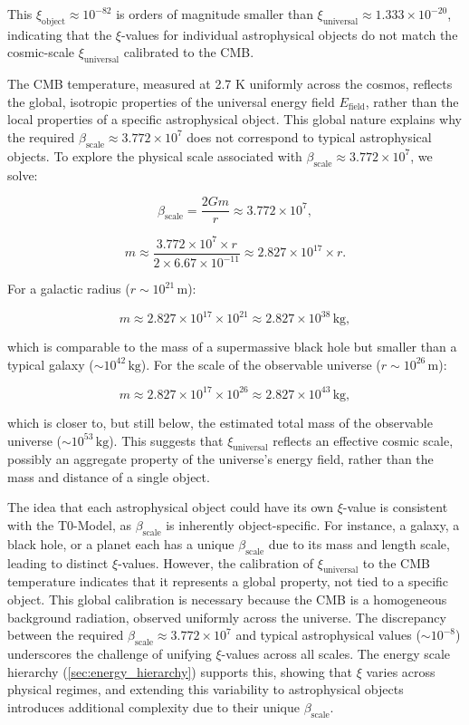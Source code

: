 \documentclass[12pt,a4paper]{report}
\newcommand{\Efield}{E_{\text{field}}}
\newcommand{\xipar}{\xi}
\newcommand{\xiuniversal}{\xi_{\text{universal}}}
\newcommand{\betascale}{\beta_{\text{scale}}}
\theoremstyle{definition}
\begin{document}
	
	This \(\xi_{\text{object}} \approx 10^{-82}\) is orders of magnitude smaller than \(\xiuniversal \approx 1.333 \times 10^{-20}\), indicating that the \(\xipar\)-values for individual astrophysical objects do not match the cosmic-scale \(\xiuniversal\) calibrated to the CMB.
	
	The CMB temperature, measured at 2.7 K uniformly across the cosmos, reflects the global, isotropic properties of the universal energy field \(\Efield\), rather than the local properties of a specific astrophysical object. This global nature explains why the required \(\betascale \approx 3.772 \times 10^7\) does not correspond to typical astrophysical objects. To explore the physical scale associated with \(\betascale \approx 3.772 \times 10^7\), we solve:
	
	\[
	\betascale = \frac{2Gm}{r} \approx 3.772 \times 10^7,
	\]
	
	\[
	m \approx \frac{3.772 \times 10^7 \times r}{2 \times 6.67 \times 10^{-11}} \approx 2.827 \times 10^{17} \times r.
	\]
	
	For a galactic radius (\(r \sim 10^{21} \, \text{m}\)):
	
	\[
	m \approx 2.827 \times 10^{17} \times 10^{21} \approx 2.827 \times 10^{38} \, \text{kg},
	\]
	
	which is comparable to the mass of a supermassive black hole but smaller than a typical galaxy (\(\sim 10^{42} \, \text{kg}\)). For the scale of the observable universe (\(r \sim 10^{26} \, \text{m}\)):
	
	\[
	m \approx 2.827 \times 10^{17} \times 10^{26} \approx 2.827 \times 10^{43} \, \text{kg},
	\]
	
	which is closer to, but still below, the estimated total mass of the observable universe (\(\sim 10^{53} \, \text{kg}\)). This suggests that \(\xiuniversal\) reflects an effective cosmic scale, possibly an aggregate property of the universe's energy field, rather than the mass and distance of a single object.
	
	The idea that each astrophysical object could have its own \(\xipar\)-value is consistent with the T0-Model, as \(\betascale\) is inherently object-specific. For instance, a galaxy, a black hole, or a planet each has a unique \(\betascale\) due to its mass and length scale, leading to distinct \(\xipar\)-values. However, the calibration of \(\xiuniversal\) to the CMB temperature indicates that it represents a global property, not tied to a specific object. This global calibration is necessary because the CMB is a homogeneous background radiation, observed uniformly across the universe. The discrepancy between the required \(\betascale \approx 3.772 \times 10^7\) and typical astrophysical values (\(\sim 10^{-8}\)) underscores the challenge of unifying \(\xipar\)-values across all scales. The energy scale hierarchy (\cref{sec:energy_hierarchy}) supports this, showing that \(\xipar\) varies across physical regimes, and extending this variability to astrophysical objects introduces additional complexity due to their unique \(\betascale\).
	
\end{document}
